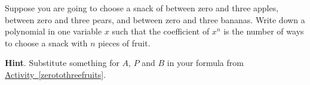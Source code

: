 \documentclass{book}
\begin{document}
\setcounter{cpjt}{241}
\addtocounter{cpjt}{-1}
\begin{activity}\label{activity-234}
\hypertarget{p-1269}{}%
Suppose you are going to choose a snack of between zero and three apples, between zero and three pears, and between zero and three bananas. Write down a polynomial in one variable \(x\) such that the coefficient of \(x^n\) is the number of ways to choose a snack with \(n\) pieces of fruit.%
\par\smallskip%
\noindent\textbf{Hint}.\hypertarget{hint-152}{}\quad%
\hypertarget{p-1270}{}%
Substitute something for \(A\), \(P\) and \(B\) in your formula from \hyperref[zerotothreefruits]{Activity~\ref{zerotothreefruits}}.%
\par\smallskip%
\noindent\end{activity}

\clearpage
\end{document}
